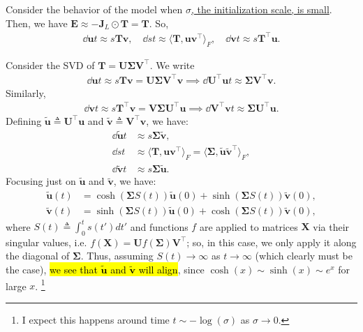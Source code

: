 \documentclass{article}
\begin{document}
Consider the behavior of the model when \underline{$\sigma$, the initialization scale, is small}.
Then, we have $\bm{E} \approx - \bm{J}_L \odot \bm{T} = \bm{T}$.
So,
\begin{align*}
    \dd{\bm{u}}{t} \approx s \bm{T} \bm{v}, \quad
    \dd{s}{t} \approx \langle \bm{T}, \bm{u} \bm{v}^\top \rangle_F, \quad
    \dd{\bm{v}}{t} \approx s \bm{T}^\top \bm{u}.
\end{align*}

Consider the SVD of $\bm{T} = \bm{U} \bm{\Sigma} \bm{V}^\top$.
We write
\begin{align*}
    \dd{\bm{u}}{t} \approx s \bm{T} \bm{v}
    = \bm{U} \bm{\Sigma} \bm{V}^\top \bm{v}
    \implies
    \dd{\bm{U}^\top \bm{u}}{t} \approx \bm{\Sigma} \bm{V}^\top \bm{v}.
\end{align*}
Similarly,
\begin{align*}
    \dd{\bm{v}}{t} \approx s \bm{T}^\top \bm{v}
    = \bm{V} \bm{\Sigma} \bm{U}^\top \bm{u}
    \implies
    \dd{\bm{V}^\top \bm{v}}{t} \approx \bm{\Sigma} \bm{U}^\top \bm{u}.
\end{align*}
Defining $\tilde{\bm{u}} \triangleq \bm{U}^\top \bm{u}$ and $\tilde{\bm{v}} \triangleq \bm{V}^\top \bm{v}$, we have:
\begin{align*}
    \dd{\tilde{\bm{u}}}{t} &\approx s \bm{\Sigma} \tilde{\bm{v}}, \\
    \dd{s}{t} &\approx \langle \bm{T}, \bm{u} \bm{v}^\top \rangle_F = \langle \bm{\Sigma}, \tilde{\bm{u}} \tilde{\bm{v}}^\top \rangle_F, \\
    \dd{\tilde{\bm{v}}}{t} &\approx s \bm{\Sigma} \tilde{\bm{u}}.
\end{align*}
Focusing just on $\tilde{\bm{u}}$ and $\tilde{\bm{v}}$, we have:
\begin{align*}
    \tilde{\bm{u}}(t) &= \cosh( \bm{\Sigma} S(t) ) \tilde{\bm{u}}(0) + \sinh( \bm{\Sigma} S(t) ) \tilde{\bm{v}}(0), \\
    \tilde{\bm{v}}(t) &= \sinh( \bm{\Sigma} S(t) ) \tilde{\bm{u}}(0) + \cosh( \bm{\Sigma} S(t) ) \tilde{\bm{v}}(0),
\end{align*}
where $S(t) \triangleq \int_0^t s(t') dt'$ and functions $f$ are applied to matrices $\bm{X}$ via their singular values, i.e. $f(\bm{X}) = \bm{U} f(\bm{\Sigma}) \bm{V}^\top$; so, in this case, we only apply it along the diagonal of $\bm{\Sigma}$.
Thus, assuming $S(t) \to \infty$ as $t \to \infty$ (which clearly must be the case), \hl{we see that $\tilde{\bm{u}}$ and $\tilde{\bm{v}}$ will align}, since $\cosh(x) \sim \sinh(x) \sim e^x$ for large $x$.
\footnote{I expect this happens around time $t \sim - \log(\sigma)$ as $\sigma \to 0$.}
\end{document}
